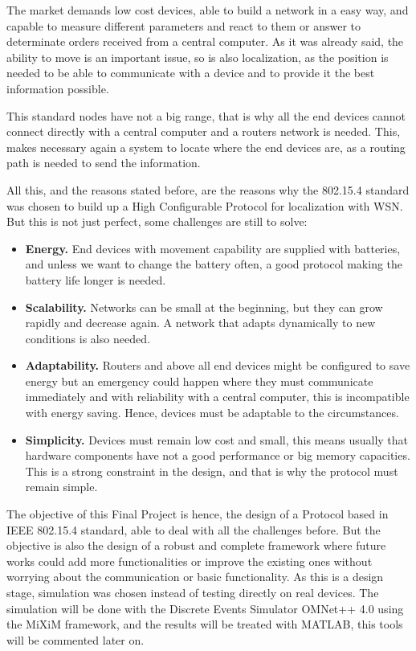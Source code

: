 The market demands low cost devices, able to build a network in a easy way, and capable to measure different parameters and react to them
or answer to determinate orders received from a central computer. As it was already said, the ability to move is an important issue, so is 
also localization, as the position is needed to be able to communicate with a device and to provide it the best information possible.

This standard nodes have not a big range, that is why all the end devices cannot connect directly with a central computer and a routers network 
is needed. This, makes necessary again a system to locate where the end devices are, as a routing path is needed to send the information.

All this, and the reasons stated before, are the reasons why the 802.15.4 standard was chosen to build up a High Configurable Protocol for 
localization with \ac{WSN}. But this is not just perfect, some challenges are still to solve:

\begin{itemize}
 \item \textbf{Energy.} End devices with movement capability are supplied with batteries, and unless we want to change the battery often,
a good protocol making the battery life longer is needed.
 \item \textbf{Scalability.} Networks can be small at the beginning, but they can grow rapidly and decrease again. A network that adapts 
dynamically to new conditions is also needed.
 \item \textbf{Adaptability.} Routers and above all end devices might be configured to save energy but an emergency could happen where they 
must communicate immediately and with reliability with a central computer, this is incompatible with energy saving. Hence, devices must be
adaptable to the circumstances.
 \item \textbf{Simplicity.} Devices must remain low cost and small, this means usually that hardware components have not a good performance
or big memory capacities. This is a strong constraint in the design, and that is why the protocol must remain simple.
\end{itemize}

The objective of this Final Project is hence, the design of a Protocol based in \ac{IEEE} 802.15.4 standard, able to deal with all the 
challenges before. But the objective is also the design of a robust and complete framework where future works could add more functionalities
or improve the existing ones without worrying about the communication or basic functionality.
As this is a design stage, simulation was chosen instead of testing directly on real devices. The simulation will be done with the Discrete 
Events Simulator \ac{OMNet++} 4.0 using the \ac{MiXiM} framework, and the results will be treated with \ac{MATLAB}, this tools will be commented later on.

